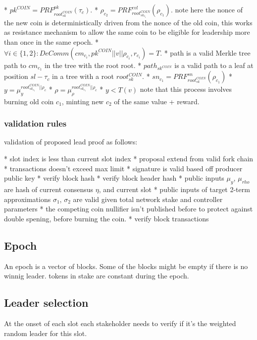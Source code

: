 \documentclass{article}
\begin{document}
 * $pk^{COIN} = PRF_{root_{sk}^{COIN}}^{pk}(\tau_c)$.
 * $\rho_{c_2}=PRF_{root_{sk_{c_1}}^{COIN}}^{evl}(\rho_{c_1})$.
 note here the nonce of the new coin is deterministically driven from the nonce of the old coin, this works as resistance mechanism to allow the same coin to be eligible for leadership more than once in the same epoch.
 * $\forall i \in \{1,2\} : DeComm(cm_{c_i},pk^{COIN}||v||\rho_{c_i},r_{c_i})=T$.
 * path is a valid Merkle tree path to $cm_{c_1}$ in the tree with the root root.
 * $path_{sk^{COIN}}$ is a valid path to a leaf at position $sl-\tau_c$ in a tree with a root $root_{sk}^{COIN}$.
 * $sn_{c_1}= PRF_{root_{sk}^{COIN}}^{sn}(\rho_{c_1})$
 * $y = \mu_{y}^{root_{sk_{c_1}}^{COIN}||\rho_c}$
 * $\rho = \mu_{\rho}^{root_{sk_{c_1}}^{COIN}||\rho_c}$
 * $y< T(v)$
note that this process involves burning old coin $c_1$, minting new  $c_2$ of the same value + reward.

\subsubsection{ validation rules}

validation of proposed lead proof as follows:

* slot index is less than current slot index
* proposal extend from valid fork chain
* transactions doesn't exceed max limit
* signature is valid based off producer public key
* verify block hash
* verify block header hash
* public inputs $\mu_y$, $\mu_{rho}$ are hash of current consensus $\eta$, and current slot
* public inputs of target 2-term approximations $\sigma_1$, $\sigma_2$ are valid given total network stake and controller parameters
* the competing coin nullifier isn't published before to protect against double spening, before burning the coin.
* verify block transactions



\subsection{ Epoch}

An epoch is a vector of blocks. Some of the  blocks might be empty if there is no winnig leader. tokens in stake are constant during the epoch.

\subsection{ Leader selection}

At the onset of each slot each stakeholder needs to verify if it's
the weighted random leader for this slot.
\end{document}
